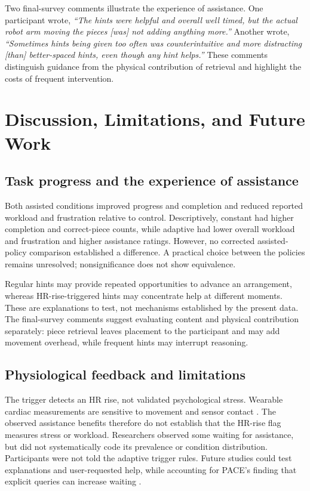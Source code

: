 \documentclass[sigconf,anonymous]{aamas}
\begin{document}
Two final-survey comments illustrate the experience of assistance. One participant wrote, \textit{``The hints were helpful and overall well timed, but the actual robot arm moving the pieces [was] not adding anything more.''} Another wrote, \textit{``Sometimes hints being given too often was counterintuitive and more distracting [than] better-spaced hints, even though any hint helps.''} These comments distinguish guidance from the physical contribution of retrieval and highlight the costs of frequent intervention.

\section{Discussion, Limitations, and Future Work}

\subsection{Task progress and the experience of assistance}
Both assisted conditions improved progress and completion and reduced reported workload and frustration relative to control. Descriptively, constant had higher completion and correct-piece counts, while adaptive had lower overall workload and frustration and higher assistance ratings. However, no corrected assisted-policy comparison established a difference. A practical choice between the policies remains unresolved; nonsignificance does not show equivalence.

Regular hints may provide repeated opportunities to advance an arrangement, whereas HR-rise-triggered hints may concentrate help at different moments. These are explanations to test, not mechanisms established by the present data. The final-survey comments suggest evaluating content and physical contribution separately: piece retrieval leaves placement to the participant and may add movement overhead, while frequent hints may interrupt reasoning.

\subsection{Physiological feedback and limitations}
The trigger detects an HR rise, not validated psychological stress. Wearable cardiac measurements are sensitive to movement and sensor contact \cite{quigley2024}. The observed assistance benefits therefore do not establish that the HR-rise flag measures stress or workload. Researchers observed some waiting for assistance, but did not systematically code its prevalence or condition distribution. Participants were not told the adaptive trigger rules. Future studies could test explanations and user-requested help, while accounting for PACE's finding that explicit queries can increase waiting \cite{delazzari2025}.
\end{document}
